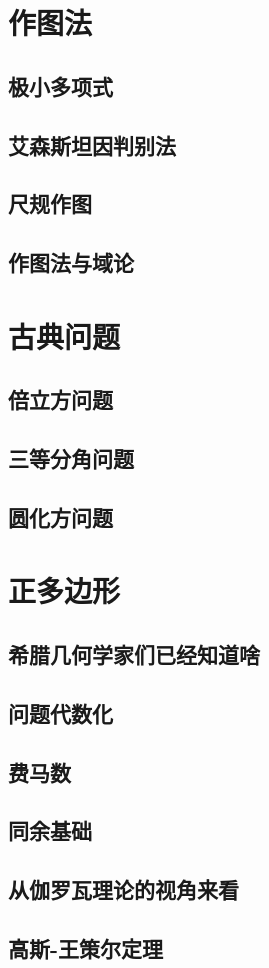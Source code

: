 \documentclass[cn,fancy,blue,11pt]{elegantbook}
\begin{document}


\appendix

\chapter{作图法}

\section{极小多项式}

\section{艾森斯坦因判别法}

\section{尺规作图}

\section{作图法与域论}

\chapter{古典问题}

\section{倍立方问题}

\section{三等分角问题}

\section{圆化方问题}

\chapter{正多边形}

\section{希腊几何学家们已经知道啥}

\section{问题代数化}

\section{费马数}

\section{同余基础}

\section{从伽罗瓦理论的视角来看}

\section{高斯-王策尔定理}
\end{document}
